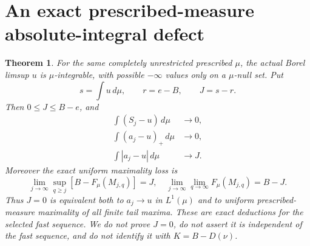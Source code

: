 \documentclass[11pt]{article}
\newtheorem{theorem}{Theorem}
\begin{document}
\section{An exact prescribed-measure absolute-integral defect}
\begin{theorem}\label{new:Lone}
For the same completely unrestricted prescribed $\mu$, the actual
Borel limsup $u$ is $\mu$-integrable, with possible $-\infty$ values
only on a $\mu$-null set. Put
\[
 s=\int u\,d\mu,\qquad r=e-B,\qquad J=s-r.
\]
Then $0\le J\le B-e$, and
\begin{align}
 \int(S_j-u)\,d\mu&\longrightarrow0,\label{new:orderedmu}\\
 \int(a_j-u)_+\,d\mu&\longrightarrow0,\label{new:onesidemu}\\
 \int|a_j-u|\,d\mu&\longrightarrow J.\label{new:exactLone}
\end{align}
Moreover the exact uniform maximality loss is
\begin{equation}\label{new:lostmax}
 \lim_{j\to\infty}\sup_{q\ge j}[B-F_\mu(M_{j,q})]=J,
 \quad
 \lim_{j\to\infty}\lim_{q\to\infty}F_\mu(M_{j,q})=B-J.
\end{equation}
Thus $J=0$ is equivalent both to $a_j\to u$ in $L^1(\mu)$ and to
uniform prescribed-measure maximality of all finite tail maxima.
These are exact deductions for the selected fast sequence. We do not
prove $J=0$, do not assert it is independent of the fast sequence,
and do not identify it with $K=B-D(\nu)$.
\end{theorem}
\end{document}
